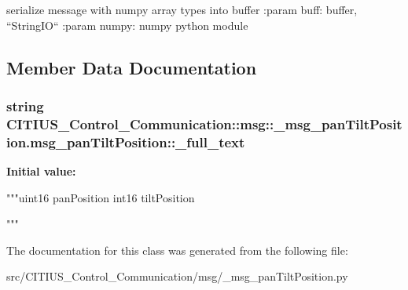 \begin{DoxyVerb}
serialize message with numpy array types into buffer
:param buff: buffer, ``StringIO``
:param numpy: numpy python module
\end{DoxyVerb}
 

\subsection{\-Member \-Data \-Documentation}
\hypertarget{class_c_i_t_i_u_s___control___communication_1_1msg_1_1__msg__pan_tilt_position_1_1msg__pan_tilt_position_af9645714d23bf43d498ff77102060907}{
\subsubsection[{\-\_\-full\-\_\-text}]{\setlength{\rightskip}{0pt plus 5cm}string \-C\-I\-T\-I\-U\-S\-\_\-\-Control\-\_\-\-Communication\-::msg\-::\-\_\-msg\-\_\-pan\-Tilt\-Position.\-msg\-\_\-pan\-Tilt\-Position\-::\-\_\-full\-\_\-text}}\label{class_c_i_t_i_u_s___control___communication_1_1msg_1_1__msg__pan_tilt_position_1_1msg__pan_tilt_position_af9645714d23bf43d498ff77102060907}
{\bfseries \-Initial value\-:}
\begin{DoxyCode}
"""uint16 panPosition
int16 tiltPosition

"""
\end{DoxyCode}


\-The documentation for this class was generated from the following file\-:\begin{DoxyCompactItemize}
\item 
src/\-C\-I\-T\-I\-U\-S\-\_\-\-Control\-\_\-\-Communication/msg/\-\_\-msg\-\_\-pan\-Tilt\-Position.\-py\end{DoxyCompactItemize}
